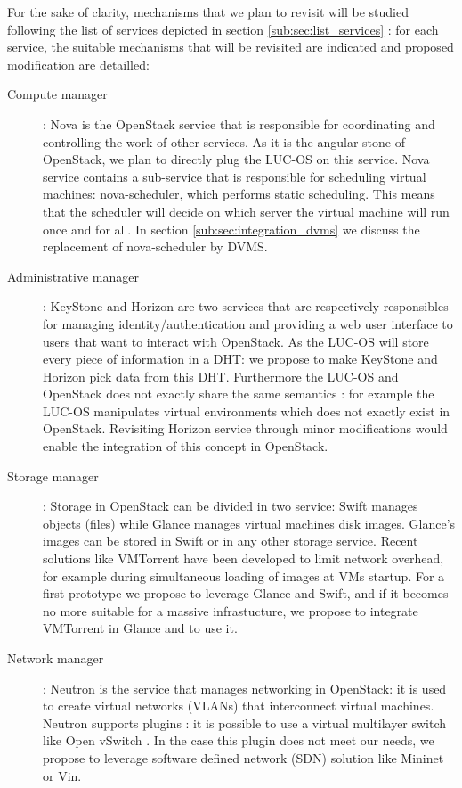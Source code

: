 For the sake of clarity, mechanisms that we plan to revisit will be studied 
following the list of services depicted in section \ref{sub:sec:list_services} :
for each service, the suitable mechanisms that will be revisited are indicated 
and proposed modification are detailled:

\begin{description}

	\item [Compute manager] : Nova is the OpenStack service that is 
	responsible for coordinating and controlling the work of other services.
	As it is the angular stone of OpenStack, we plan to directly plug the 
	LUC-OS on this service. Nova service contains a sub-service that is
	responsible for scheduling virtual machines: nova-scheduler, which performs
	static scheduling. This means that the scheduler will decide on which
	server the virtual machine will run once and for all. In section 
	\ref{sub:sec:integration_dvms} we discuss the replacement of 
	nova-scheduler by DVMS.


	\item [Administrative manager] : KeyStone and Horizon are two services
	that are respectively responsibles for managing identity/authentication
	and providing a web user interface to users that want to interact with
	OpenStack. As the LUC-OS will store every piece of information in a DHT: we
	propose to make KeyStone and Horizon pick data from this DHT. Furthermore 
	the LUC-OS and OpenStack does not exactly share the same semantics : for
	example the LUC-OS manipulates virtual environments which does not
	exactly exist in OpenStack. Revisiting Horizon service through minor
	modifications would enable the integration of this concept in OpenStack.

	\item [Storage manager] : Storage in OpenStack can be divided in two
	service: Swift manages objects (files) while Glance manages virtual machines
	disk images. Glance's images can be stored in Swift or in any other storage
	service. Recent solutions like VMTorrent \cite{reich:2012} have been
	developed to limit network overhead, for example during simultaneous 
	loading of images at VMs startup. For a first prototype we propose to 
	leverage Glance and Swift, and if it becomes no more suitable for a
	massive infrastucture, we propose to integrate VMTorrent in Glance and 
	to use it.

	\item [Network manager] : Neutron is the service that manages networking
	in OpenStack: it is used to create virtual networks (VLANs) that
	interconnect virtual machines. Neutron supports plugins : it is possible
	to use a virtual multilayer switch like Open vSwitch \cite{pfaff:2009}.
	In the case this plugin does not meet our needs, we propose to 
	leverage software defined network (SDN) solution like Mininet 
	\cite{lantz:2010} or Vin.

\end{description}